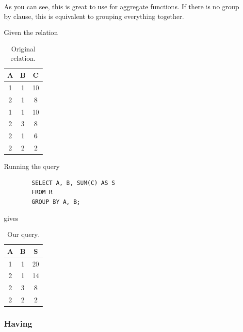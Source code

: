     As you can see, this is great to use for aggregate functions. If there is no group by clause, this is equivalent to grouping everything together.  

    \begin{example}
      \label{ex:group-by-on-a-sample-relation}
      Given the relation 

      \begin{table}[H]
        \centering
        \begin{tabular}{|c|c|c|}
          \hline
          \textbf{A} & \textbf{B} & \textbf{C} \\
          \hline
          1 & 1 & 10 \\ 
          2 & 1 & 8 \\ 
          1 & 1 & 10 \\ 
          2 & 3 & 8 \\ 
          2 & 1 & 6 \\ 
          2 & 2 & 2 \\ 
          \hline
        \end{tabular}
        \caption{Original relation. }
        \label{tab:groupby}
      \end{table}
    
      Running the query 
      \begin{lstlisting}
        SELECT A, B, SUM(C) AS S 
        FROM R 
        GROUP BY A, B; 
      \end{lstlisting}
      gives 
      
      \begin{table}[H]
        \centering
        \begin{tabular}{|c|c|c|}
          \hline
          \textbf{A} & \textbf{B} & \textbf{S} \\
          \hline
          1 & 1 & 20 \\ 
          2 & 1 & 14 \\ 
          2 & 3 & 8 \\ 
          2 & 2 & 2 \\ 
          \hline
        \end{tabular}
        \caption{Our query. }
        \label{tab:groupby_output}
      \end{table}
    \end{example}

  \subsubsection{Having} 

